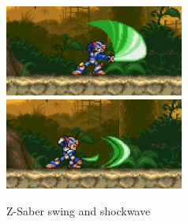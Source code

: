 \begin{figure}[htp] 
	\centering
	\includegraphics[height=3cm]{figures/X3/weapons/Z_saber_1.png}
	\includegraphics[height=3cm]{figures/X3/weapons/Z_saber_2.png}
	\caption{Z-Saber swing and shockwave}
\end{figure}

